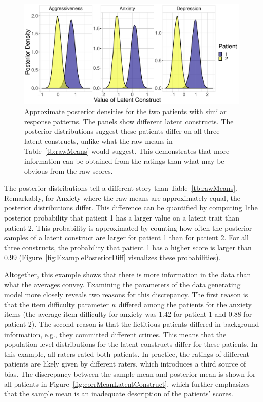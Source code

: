 \documentclass[a4paper]{article}
\begin{document}
\begin{figure}[!ht]
	\includegraphics[width=\textwidth]{figures/twoPatientsDensity.pdf}
	\caption{Approximate posterior densities for the two patients with similar response patterns. The panels show different latent constructs. The posterior distributions suggest these patients differ on all three latent constructs, unlike what the raw means in Table~\ref{tb:rawMeans} would suggest. This demonstrates that more information can be obtained from the ratings than what may be obvious from the raw scores.}
	\label{fig:ExamplePosterior}
\end{figure}
The posterior distributions tell a different story than Table~\ref{tb:rawMeans}. Remarkably, for Anxiety where the raw means are approximately equal, the posterior distributions differ. This difference can be quantified by computing 1the posterior probability that patient 1 has a larger value on a latent trait than patient 2. This probability is approximated by counting how often the posterior samples of a latent construct are larger for patient 1 than for patient 2. For all three constructs, the probability that patient 1 has a higher score is larger than $0.99$ (Figure~\ref{fig:ExamplePosteriorDiff} visualizes these probabilities).

Altogether, this example shows that there is more information in the data than what the averages convey. Examining the parameters of the data generating model more closely reveals two reasons for this discrepancy. The first reason is that the item difficulty parameter $\kappa$ differed among the patients for the anxiety items (the average item difficulty for anxiety was 1.42 for patient 1 and 0.88 for patient 2). The second reason is that the fictitious patients differed in background information, e.g., they committed different crimes. This means that the population level distributions for the latent constructs differ for these patients. In this example, all raters rated both patients. In practice, the ratings of different patients are likely given by different raters, which introduces a third source of bias. The discrepancy between the sample mean and posterior mean is shown for all patients in Figure~\ref{fig:corrMeanLatentConstruct}, which further emphasizes that the sample mean is an inadequate description of the patients' scores.
\end{document}
